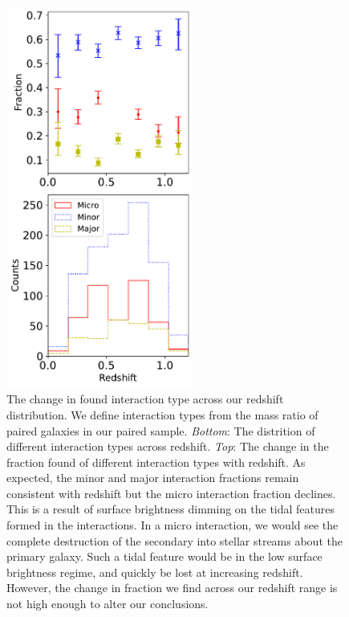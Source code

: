 \begin{figure}
\centering
\includegraphics[width=0.55\textwidth]{Chapter3/figures/mass-ratio-limitation.pdf}
\caption[The change in found interaction type across our redshift distribution.]{The change in found interaction type across our redshift distribution. We define interaction types from the mass ratio of paired galaxies in our paired sample. \textit{Bottom}: The distrition of different interaction types across redshift. \textit{Top}: The change in the fraction found of different interaction types with redshift. As expected, the minor and major interaction fractions remain consistent with redshift but the micro interaction fraction declines. This is a result of surface brightness dimming on the tidal features formed in the interactions. In a micro interaction, we would see the complete destruction of the secondary into stellar streams about the primary galaxy. Such a tidal feature would be in the low surface brightness regime, and quickly be lost at increasing redshift. However, the change in fraction we find across our redshift range is not high enough to alter our conclusions.}
\label{fig:mass-ratio-limitation}
\end{figure}

